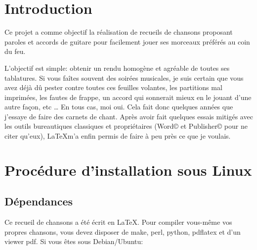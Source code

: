 \documentclass[a4paper]{article}
\begin{document}

\newpage
\tableofcontents
\newpage



\section*{Introduction}

Ce projet a comme objectif la réalisation de recueils de chansons
proposant paroles et accords de guitare pour facilement jouer ses
morceaux préférés au coin du feu.

L'objectif est simple: obtenir un rendu homogène et agréable de toutes
ses tablatures. Si vous faîtes souvent des soirées musicales, je suis
certain que vous avez déjà dû pester contre toutes ces feuilles
volantes, les partitions mal imprimées, les fautes de frappe, un
accord qui sonnerait mieux en le jouant d'une autre façon, etc \dots
En tous cas, moi oui. Cela fait donc quelques années que j'essaye de
faire des carnets de chant. Après avoir fait quelques essais mitigés
avec les outils bureautiques classiques et propriétaires (Word© et
Publisher© pour ne citer qu'eux), \LaTeX m'a enfin permis de faire à
peu près ce que je voulais.

\section{Procédure d'installation sous Linux}

\subsection{Dépendances}

Ce recueil de chansons a été écrit en \LaTeX. Pour compiler vous-même
vos propres chansons, vous devez disposer de make, perl, python,
pdflatex et d'un viewer pdf. Si vous êtes sous Debian/Ubuntu:
\end{document}
